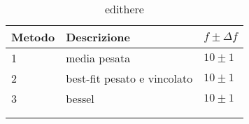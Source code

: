\begin{longtable}{@{}lll@{}}
\toprule
Metodo & Descrizione & $f \pm \Delta f$ \tabularnewline
\midrule
1 & media pesata & $10 \pm 1$ \tabularnewline
2 & best-fit pesato e vincolato & $10 \pm 1$ \tabularnewline
3 & bessel & $10 \pm 1$ \tabularnewline
\bottomrule
\label{tab:edithere}
\\
\caption{edithere}
\end{longtable}
